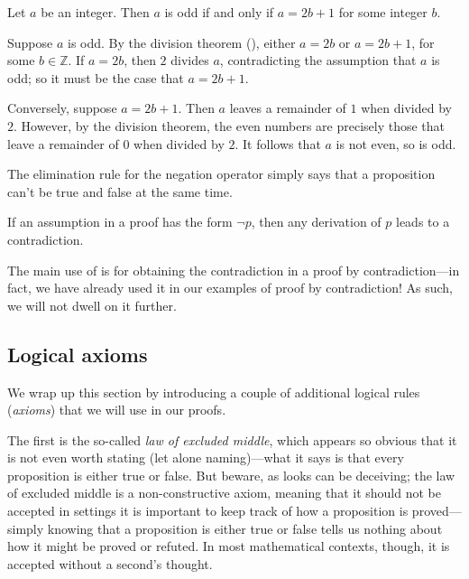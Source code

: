 \begin{proposition}
\label{propOddIffRemainderOfOne}
Let $a$ be an integer. Then $a$ is odd if and only if $a=2b+1$ for some integer $b$.
\end{proposition}
\begin{cproof}
Suppose $a$ is odd. By the division theorem (), either $a=2b$ or $a=2b+1$, for some $b \in \mathbb{Z}$. If $a=2b$, then $2$ divides $a$, contradicting the assumption that $a$ is odd; so it must be the case that $a=2b+1$.

Conversely, suppose $a=2b+1$. Then $a$ leaves a remainder of $1$ when divided by $2$. However, by the division theorem, the even numbers are precisely those that leave a remainder of $0$ when divided by $2$. It follows that $a$ is not even, so is odd.
\end{cproof}

The elimination rule for the negation operator \elimrule{\neg} simply says that a proposition can't be true and false at the same time.

\begin{strategy}
\label{strAssumingNegations}
If an assumption in a proof has the form $\neg p$, then any derivation of $p$ leads to a contradiction.
\end{strategy}

The main use of  is for obtaining the contradiction in a proof by contradiction---in fact, we have already used it in our examples of proof by contradiction! As such, we will not dwell on it further.

\subsection*{Logical axioms}

We wrap up this section by introducing a couple of additional logical rules (\textit{axioms}) that we will use in our proofs.

The first is the so-called \textit{law of excluded middle}, which appears so obvious that it is not even worth stating (let alone naming)---what it says is that every proposition is either true or false. But beware, as looks can be deceiving; the law of excluded middle is a non-constructive axiom, meaning that it should not be accepted in settings it is important to keep track of how a proposition is proved---simply knowing that a proposition is either true or false tells us nothing about how it might be proved or refuted. In most mathematical contexts, though, it is accepted without a second's thought.

